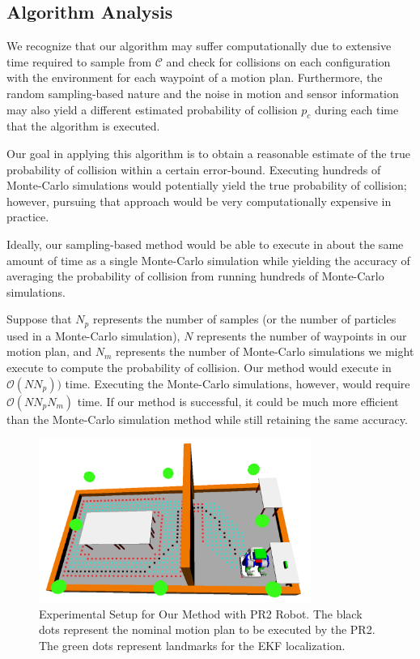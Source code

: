 \documentclass[journal]{IEEEtran}
\begin{document}
\subsection{Algorithm Analysis}
We recognize that our algorithm may suffer computationally due to extensive time required to sample from $\mathcal{C}$ and check for collisions on each configuration with the environment for each waypoint of a motion plan. Furthermore, the random sampling-based nature and the noise in motion and sensor information may also yield a different estimated probability of collision $p_c$ during each time that the algorithm is executed.

Our goal in applying this algorithm is to obtain a reasonable estimate of the true probability of collision within a certain error-bound. Executing hundreds of Monte-Carlo simulations would potentially yield the true probability of collision; however, pursuing that approach would be very computationally expensive in practice.

Ideally, our sampling-based method would be able to execute in about the same amount of time as a single Monte-Carlo simulation while yielding the accuracy of averaging the probability of collision from running hundreds of Monte-Carlo simulations.

Suppose that $N_p$ represents the number of samples (or the number of particles used in a Monte-Carlo simulation), $N$ represents the number of waypoints in our motion plan, and $N_m$ represents the number of Monte-Carlo simulations we might execute to compute the probability of collision. Our method would execute in $\mathcal{O}(NN_p))$ time. Executing the Monte-Carlo simulations, however, would require $\mathcal{O}(NN_pN_m)$ time. If our method is successful, it could be much more efficient than the Monte-Carlo simulation method while still retaining the same accuracy.



\begin{figure}[!t]
\centering
\includegraphics[width=3.5in]{env_setup.png}
\caption{Experimental Setup for Our Method with PR2 Robot. The black dots represent the nominal motion plan to be executed by the PR2. The green dots represent landmarks for the EKF localization.}
\label{pr2_setup}
\end{figure}
\end{document}
